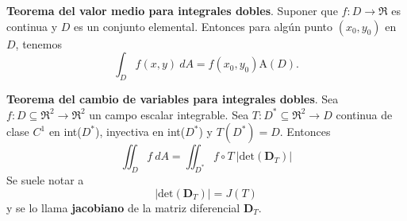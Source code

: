 \begin{theorem}
    \textbf{Teorema del valor medio para integrales dobles}. Suponer que $f:D\to\Re$ es continua y $D$ es un conjunto elemental. Entonces para alg\'un punto $(x_0,y_0)$ en $D$, tenemos
    \[
        \int_D f(x,y)\:dA=f(x_0,y_0)\text{A}(D).
    \]
\end{theorem}
\begin{theorem} %
    \textbf{Teorema del cambio de variables para integrales dobles}. Sea $f:D\subseteq\Re^2\to\Re^2$ un campo escalar integrable. Sea $T:D^*\subseteq\Re^2\to D$ continua de clase $C^1$ en int($D^*$), inyectiva en int($D^*$) y $T(D^*)=D$. Entonces
    \[
        \iint_D f\:dA=\iint_{D^*}f\circ T\:|\text{det}(\boldsymbol{D}_T)|
    \]
    Se suele notar a 
    \[
        |\text{det}(\boldsymbol{D}_T)|=J(T)
    \]
    y se lo llama \textbf{jacobiano} de la matriz diferencial $\boldsymbol{D}_T$.
\end{theorem}